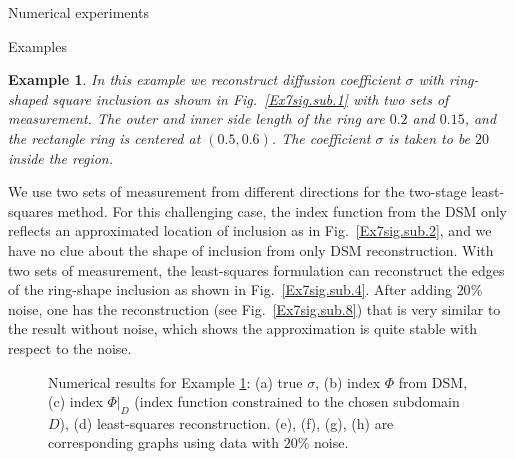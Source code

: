 \documentclass[11pt]{article}%
\renewcommand{\_}{{\fontfamily{ptm}\selectfont\textunderscore}}
\theoremstyle{plain}
\numberwithin{equation}{section}
\newtheorem{exam}{Example}
\begin{document}
\begin{section}{Numerical experiments}
\begin{subsection}{Examples}
\begin{exam}\label{example4}
 In this example we reconstruct diffusion coefficient $\sigma$ with ring-shaped square inclusion as shown in Fig.~\ref{Ex7sig.sub.1} with two sets of measurement. The outer and inner side length of the ring are $0.2$ and $0.15$, 
 and the rectangle ring is centered at $(0.5,0.6)$. The coefficient $\sigma$ is taken to be $20$ inside the region.
\end{exam}
We use two sets of measurement from different directions for the two-stage least-squares method. For this challenging case, the index function from the DSM  only reflects an approximated location of inclusion as in Fig.~\ref{Ex7sig.sub.2}, and we have no clue about the shape of inclusion from only DSM reconstruction.  With two sets of measurement, the
least-squares formulation can reconstruct the edges of the ring-shape inclusion as shown in Fig.~\ref{Ex7sig.sub.4}. 
After adding $20\%$ noise, one has the reconstruction (see Fig.~\ref{Ex7sig.sub.8}) that is very similar to the result without noise, which shows the approximation is quite stable with respect to the noise.
\begin{figure}[ht!]
\centering
{}
\caption{Numerical results for Example \ref{example4}: (a) true $\sigma$,  (b) index $\Phi$ from DSM, (c) index $\Phi|_D$ (index function constrained to the chosen subdomain $D$), (d) least-squares reconstruction.  (e), (f), (g), (h) are corresponding graphs using data with $20\%$ noise. }
\label{Ex126.main}
\end{figure}

\end{subsection}
\end{section}
\end{document}
